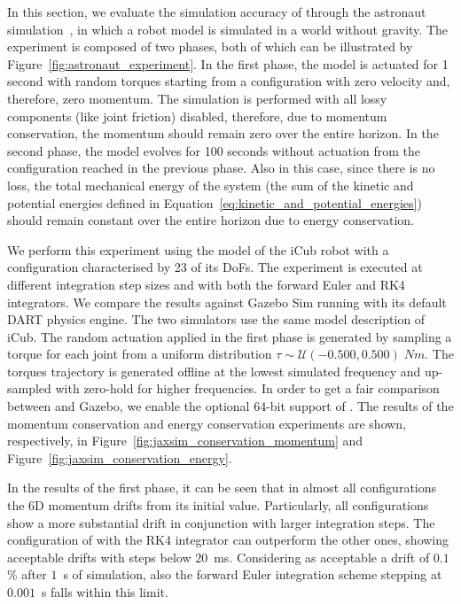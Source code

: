 In this section, we evaluate the simulation accuracy of \jaxsim through the astronaut simulation~\parencite{erezSimulationToolsModelbased2015s, howell_dojo_2022}, in which a robot model is simulated in a world without gravity.
The experiment is composed of two phases, both of which can be illustrated by Figure~\ref{fig:astronaut_experiment}.
In the first phase, the model is actuated for 1 second with random torques starting from a configuration with zero velocity and, therefore, zero momentum.
The simulation is performed with all lossy components (like joint friction) disabled, therefore, due to momentum conservation, the momentum should remain zero over the entire horizon.
In the second phase, the model evolves for 100 seconds without actuation from the configuration reached in the previous phase.
Also in this case, since there is no loss, the total mechanical energy of the system (\ie the sum of the kinetic and potential energies defined in Equation~\eqref{eq:kinetic_and_potential_energies}) should remain constant over the entire horizon due to energy conservation.

We perform this experiment using the model of the iCub robot with a configuration characterised by 23 of its \acp{DoF}.
The experiment is executed at different integration step sizes and with both the forward Euler and \ac{RK4} integrators.
We compare the results against Gazebo Sim running with its default DART physics engine.
The two simulators use the same model description of iCub.
The random actuation applied in the first phase is generated by sampling a torque for each joint from a uniform distribution $\tau \sim \mathcal{U}(-0.500, 0.500) \; Nm$.
The torques trajectory is generated offline at the lowest simulated frequency and up-sampled with zero-hold for higher frequencies.
In order to get a fair comparison between \jaxsim and Gazebo, we enable the optional 64-bit support of \jax.
The results of the momentum conservation and energy conservation experiments are shown, respectively, in Figure~\ref{fig:jaxsim_conservation_momentum} and Figure~\ref{fig:jaxsim_conservation_energy}.

In the results of the first phase, it can be seen that in almost all configurations the 6D momentum drifts from its initial value.
Particularly, all configurations show a more substantial drift in conjunction with larger integration steps.
The configuration of \jaxsim with the \ac{RK4} integrator can outperform the other ones, showing acceptable drifts with steps below $20$~ms.
Considering as acceptable a drift of $0.1$\% after $1$~s of simulation, also the forward Euler integration scheme stepping at $0.001$~s falls within this limit.

